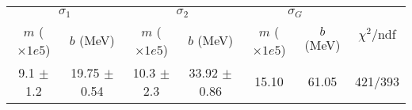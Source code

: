 \begin{tabular}{cc|cc|cc||c}
\multicolumn{2}{c|}{$\sigma_1$} & \multicolumn{2}{|c}{$\sigma_2$} & \multicolumn{2}{|c}{$\sigma_G$}  & \multirow{2}{*}{$\chi^2/$ndf}\\
$m$ ($\times1e5$) & $b$ (MeV) & $m$ ($\times1e5$) & $b$ (MeV) & $m$ ($\times1e5$) & $b$ (MeV) & \\
\hline
9.1 $\pm$ 1.2 & 19.75 $\pm$ 0.54 & 10.3 $\pm$ 2.3 & 33.92 $\pm$ 0.86 & 15.10 & 61.05 & 421/393\\
\end{tabular}
